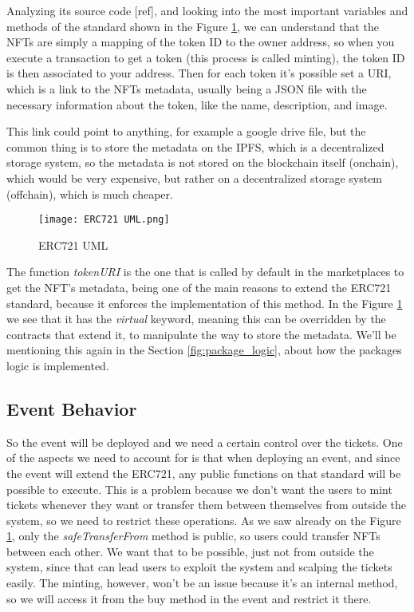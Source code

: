 Analyzing its source code [ref], and looking into the most important variables
and methods of the standard shown in the Figure \ref{fig:erc721_uml}, we can
understand that the NFTs are simply a mapping of the token ID to the owner
address, so when you execute a transaction to get a token (this process is
called minting), the token ID is then associated to your address. Then for each
token it's possible set a URI, which is a link to the NFTs metadata, usually
being a JSON file with the necessary information about the token, like the
name, description, and image.

This link could point to anything, for example a google drive file, but the
common thing is to store the metadata on the IPFS, which is a decentralized
storage system, so the metadata is not stored on the blockchain itself
(onchain), which would be very expensive, but rather on a decentralized storage
system (offchain), which is much cheaper.

\begin{figure}[H]
	\texttt{[image: ERC721 UML.png]}
	\centering
	\caption{ERC721 UML}
	\label{fig:erc721_uml}
\end{figure}

The function \textit{tokenURI} is the one that is called by default in the
marketplaces to get the NFT's metadata, being one of the main reasons to extend
the ERC721 standard, because it enforces the implementation of this method. In
the Figure \ref{fig:erc721_uml} we see that it has the \textit{virtual}
keyword, meaning this can be overridden by the contracts that extend it, to
manipulate the way to store the metadata. We'll be mentioning this again in the
Section \ref{fig:package_logic}, about how the packages logic is implemented.

\subsection{Event Behavior}
\label{subsec:event_behavior}

So the event will be deployed and we need a certain control over the tickets.
One of the aspects we need to account for is that when deploying an event, and
since the event will extend the ERC721, any public functions on that standard
will be possible to execute. This is a problem because we don't want the users
to mint tickets whenever they want or transfer them between themselves from
outside the system, so we need to restrict these operations. As we saw already
on the Figure \ref{fig:erc721_uml}, only the \textit{safeTransferFrom} method
is public, so users could transfer NFTs between each other. We want that to be
possible, just not from outside the system, since that can lead users to
exploit the system and scalping the tickets easily. The minting, however, won't
be an issue because it's an internal method, so we will access it from the buy
method in the event and restrict it there.


